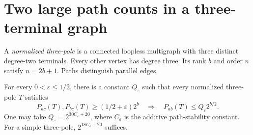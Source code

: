 \section{Two large path counts in a three-terminal graph}
\label{sec:three-pole-high-pair-tradeoff}

A \emph{normalized three-pole} is a connected loopless multigraph with three distinct degree-two terminals.
Every other vertex has degree three.
Its rank $b$ and order $n$ satisfy $n=2b+1$.
Paths distinguish parallel edges.

\begin{theorem}
\label{thm:three-pole-two-high}
For every $0<\varepsilon\le1/2$, there is a constant $Q_\varepsilon$ such that every normalized three-pole $T$ satisfies
\[
 P_{ac}(T),P_{bc}(T)\ge(1/2+\varepsilon)2^b
 \quad\Longrightarrow\quad
 P_{ab}(T)\le Q_\varepsilon 2^{b/2}.
\]
One may take $Q_\varepsilon=2^{30C_\varepsilon+20}$, where $C_\varepsilon$ is the additive path-stability constant.
For a simple three-pole, $2^{18C_\varepsilon+20}$ suffices.
\end{theorem}

